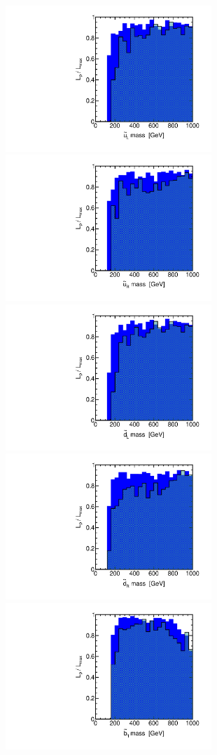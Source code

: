 \begin{figure}[htbp]
\begin{center}
\includegraphics[height=5.5cm]{figs/fig_u_L.pdf} 
\includegraphics[height=5.5cm]{figs/fig_u_R.pdf} \\
\includegraphics[height=5.5cm]{figs/fig_d_L.pdf} 
\includegraphics[height=5.5cm]{figs/fig_d_R.pdf} \\
\includegraphics[height=5.5cm]{figs/fig_b_1.pdf} 

\end{center}
\end{figure}
